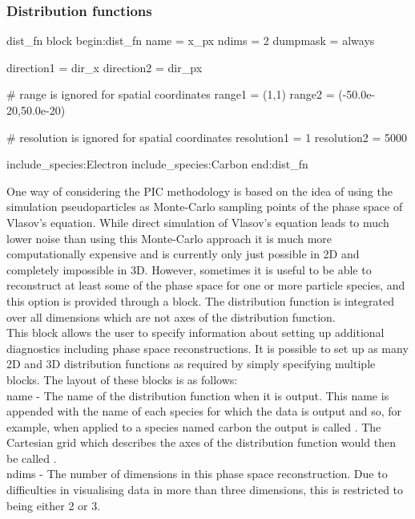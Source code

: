 \subsubsection{Distribution functions}
%
\begin{nbboxverbatim}{dist\_fn block}
begin:dist_fn
   name = x_px
   ndims = 2
   dumpmask = always

   direction1 = dir_x
   direction2 = dir_px

   # range is ignored for spatial coordinates
   range1 = (1,1)
   range2 = (-50.0e-20,50.0e-20)

   # resolution is ignored for spatial coordinates
   resolution1 = 1
   resolution2 = 5000

   include_species:Electron
   include_species:Carbon
end:dist_fn
\end{nbboxverbatim}

One way of considering the PIC methodology is based on the idea of using the
simulation pseudoparticles as Monte-Carlo sampling points of the phase space
of Vlasov's equation. While direct simulation of Vlasov's equation leads to
much lower noise than using this Monte-Carlo approach it is much more
computationally expensive and is currently only just possible in 2D and
completely impossible in 3D. However, sometimes it is useful to be able to
reconstruct at least some of the phase space for one or more particle species,
and this option is provided through a  block. The
distribution function is integrated over all dimensions which are not axes of
the distribution function.\\

This block allows the user to specify information about
setting up additional diagnostics including phase space reconstructions. It is
possible to set up as many 2D and 3D distribution functions as required by
simply specifying multiple  blocks. The layout of these
blocks is as follows:\\

{\emphtext name} - The name of the distribution function when it is
output. This name is appended with the name of each species for which the data
is output and so, for example, when applied to a species named
carbon the output is called . The Cartesian grid
which describes the axes of the distribution function would then be called
.\\

{\emphtext ndims} - The number of dimensions in this phase space
reconstruction. Due to difficulties in visualising data in more than three
dimensions, this is restricted to being either 2 or 3.\\

